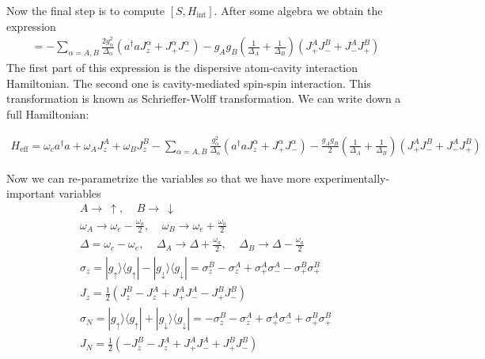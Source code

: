 \documentclass{article}
\numberwithin{equation}{section}
\begin{document}
Now the final step is to compute $[S,H_\text{int}]$. After some algebra we obtain the expression
\begin{gather}
    [S,H_\text{int}] = -\sum_{\alpha=A,B} \frac{2 g_\alpha^2}{\Delta_\alpha} (a^\dagger a J_z^\alpha + J_{+}^\alpha J_{-}^\alpha) - g_A g_B \left( \frac{1}{\Delta_A} + \frac{1}{\Delta_B} \right)  (J_{+}^A J_{-}^B + J_{-}^A J_{+}^B)
\end{gather}
\noindent The first part of this expression is the dispersive atom-cavity interaction Hamiltonian. The second one is cavity-mediated spin-spin interaction. This transformation is known as Schrieffer-Wolff transformation. We can write down a full Hamiltonian:

\begin{gather}
    H_\text{eff} = \omega_c a^\dagger a + \omega_A J_{z}^A + \omega_B J_{z}^B  -\sum_{\alpha=A,B} \frac{g_\alpha^2}{\Delta_\alpha} (a^\dagger a J_z^\alpha + J_{+}^\alpha J_{-}^\alpha) - \frac{g_A g_B}{2} \left( \frac{1}{\Delta_A} + \frac{1}{\Delta_B} \right)  (J_{+}^A J_{-}^B + J_{-}^A J_{+}^B)
    \label{eq:full_disp_ham}
\end{gather}

Now we can re-parametrize the variables so that we have more experimentally-important variables
\begin{gather}
    A \rightarrow ~\uparrow , ~~~~~ B \rightarrow ~\downarrow  \\
    \omega_A \rightarrow \omega_e - \frac{\omega_a}{2}, ~~~~~ \omega_B \rightarrow \omega_e + \frac{\omega_a}{2}\\
    \Delta = \omega_c - \omega_e, ~~~~~    \Delta_A \rightarrow \Delta + \frac{\omega_a}{2}, ~~~~~\Delta_B \rightarrow \Delta - \frac{\omega_a}{2}\\
    \sigma_z = |g_\uparrow \rangle \langle g_\uparrow | - |g_\downarrow \rangle \langle g_\downarrow | = \sigma_z^B - \sigma_z^A + \sigma_{+}^A \sigma_{-}^A - \sigma_{+}^B \sigma_{+}^B \\
    J_z = \frac{1}{2} (J_z^B - J_z^A + J_{+}^A J_{-}^A - J_{+}^B J_{-}^B )\\
    \sigma_N =  |g_\uparrow \rangle \langle g_\uparrow | + |g_\downarrow \rangle \langle g_\downarrow | = - \sigma_z^B - \sigma_z^A + \sigma_{+}^A \sigma_{-}^A + \sigma_{+}^B \sigma_{+}^B \\
    J_N =\frac{1}{2} ( - J_z^B - J_z^A + J_{+}^A J_{-}^A + J_{+}^B J_{-}^B) 
\end{gather} 
\end{document}
